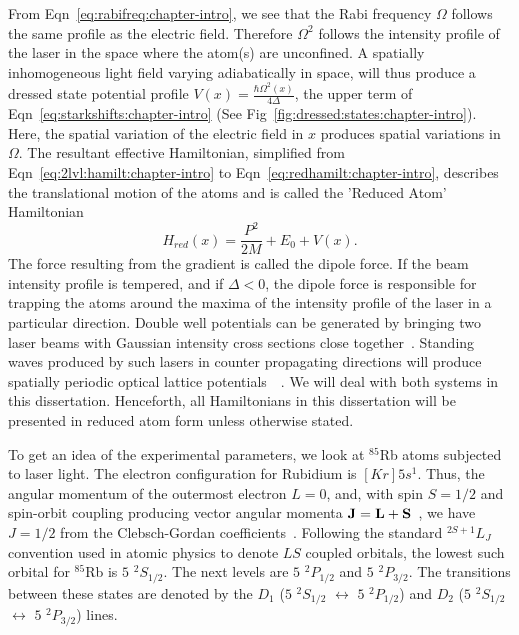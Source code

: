 From Eqn~\ref{eq:rabifreq:chapter-intro}, we see that the Rabi frequency $\Omega$ follows the same profile as the electric field. Therefore $\Omega^2$ follows the intensity profile of the laser in the space where the atom(s) are unconfined. A spatially inhomogeneous light field varying adiabatically in space, will thus produce a dressed state potential profile $V(x) =  \frac{ \hbar \Omega^2(x)}{4\Delta}$, the upper term of Eqn~\ref{eq:starkshifts:chapter-intro} (See Fig~\ref{fig:dressed:states:chapter-intro}). Here, the spatial variation of the electric field in $x$ produces spatial variations in $\Omega$. The resultant effective Hamiltonian, simplified from Eqn~\ref{eq:2lvl:hamilt:chapter-intro} to Eqn~\ref{eq:redhamilt:chapter-intro}, describes the translational motion of the atoms and is called the 'Reduced Atom' Hamiltonian
\begin{equation}
H_{red}(x) = \frac{P^2}{2M} + E_0 + V(x).
\end{equation}
The force resulting from the gradient is called the dipole force. If the beam intensity profile is tempered, and if $\Delta<0$, the dipole force is responsible for trapping the atoms around the maxima of the intensity profile of the laser in a particular direction. Double well potentials can be generated by bringing two laser beams with Gaussian intensity cross sections close together~\cite{dudarev:entanglement}. Standing waves produced by such lasers in counter propagating directions will produce spatially periodic optical lattice potentials~\cite{Deutsch:Jessen}~\cite{oplattice:bloch}. We will deal with both systems in this dissertation. Henceforth, all Hamiltonians in this dissertation will be presented in reduced atom form unless otherwise stated. 

To get an idea of the experimental parameters, we look at  $^{85}$Rb  atoms subjected to laser light. The electron configuration for Rubidium is $[Kr] 5s^1$. Thus, the angular momentum of the outermost electron $L=0$, and, with spin $S=1/2$ and spin-orbit coupling producing vector angular momenta ${\bf J}={\bf L}+{\bf S}$~\cite{rbdata}, we have $ J=1/2$ from the Clebsch-Gordan coefficients~\cite{sakurai}. Following the standard $^{2S+1}L_J$ convention used in atomic physics to denote $LS$ coupled orbitals, the lowest such orbital for  $^{85}$Rb is $5$ $^2S_{1/2}$. The next levels are $5$ $^2P_{1/2}$ and $5$ $^2P_{3/2}$. The transitions between these states are denoted by the $D_1$ ($5$ $^2S_{1/2}$ $\leftrightarrow$ $5$ $^2P_{1/2}$) and $D_2$ ($5$ $^2S_{1/2}$ $\leftrightarrow$ $5$ $^2P_{3/2} $) lines. 

